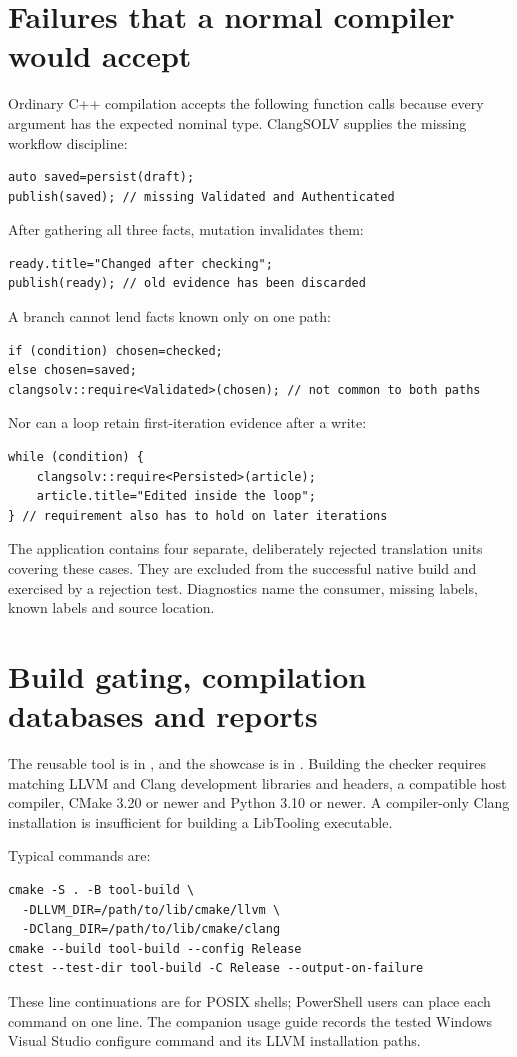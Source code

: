 \documentclass[11pt]{article}
\begin{document}
\section{Failures that a normal compiler would accept}
Ordinary C++ compilation accepts the following function calls because every
argument has the expected nominal type. ClangSOLV supplies the missing workflow
discipline:
\begin{lstlisting}
auto saved=persist(draft);
publish(saved); // missing Validated and Authenticated
\end{lstlisting}
After gathering all three facts, mutation invalidates them:
\begin{lstlisting}
ready.title="Changed after checking";
publish(ready); // old evidence has been discarded
\end{lstlisting}
A branch cannot lend facts known only on one path:
\begin{lstlisting}
if (condition) chosen=checked;
else chosen=saved;
clangsolv::require<Validated>(chosen); // not common to both paths
\end{lstlisting}
Nor can a loop retain first-iteration evidence after a write:
\begin{lstlisting}
while (condition) {
    clangsolv::require<Persisted>(article);
    article.title="Edited inside the loop";
} // requirement also has to hold on later iterations
\end{lstlisting}
The application contains four separate, deliberately rejected translation
units covering these cases. They are excluded from the successful native
build and exercised by a rejection test. Diagnostics name the consumer,
missing labels, known labels and source location.

\section{Build gating, compilation databases and reports}
The reusable tool is in , and the showcase
is in . Building the checker requires
matching LLVM and Clang development libraries and headers, a compatible host
compiler, CMake 3.20 or newer and Python 3.10 or newer. A compiler-only Clang
installation is insufficient for building a LibTooling executable.

Typical commands are:
\begin{lstlisting}[language={}]
cmake -S . -B tool-build \
  -DLLVM_DIR=/path/to/lib/cmake/llvm \
  -DClang_DIR=/path/to/lib/cmake/clang
cmake --build tool-build --config Release
ctest --test-dir tool-build -C Release --output-on-failure
\end{lstlisting}
These line continuations are for POSIX shells; PowerShell users can place each
command on one line. The companion usage guide records the tested Windows
Visual Studio configure command and its LLVM installation paths.
\end{document}
